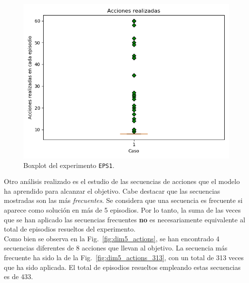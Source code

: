 \begin{figure}
    \centering
    \includegraphics[scale=0.4]{cap5_experimentacion/images/dim5_boxplot.png}
    \caption{Boxplot del experimento \texttt{EPS1}.}
    \label{fig:dim5_boxplot}
\end{figure}

Otro análisis realizado es el estudio de las secuencias de acciones que el modelo ha aprendido para alcanzar el objetivo. Cabe destacar que las secuencias mostradas son las más \textit{frecuentes}. Se considera que una secuencia es frecuente si aparece como solución en más de 5 episodios. Por lo tanto, la suma de las veces que se han aplicado las secuencias frecuentes \textbf{no} es necesariamente equivalente al total de episodios resueltos del experimento. \\

Como bien se observa en la 
Fig.~\ref{fig:dim5_actions}, se han encontrado 4 secuencias diferentes de 8 acciones que llevan al objetivo. La secuencia más frecuente ha sido la de la Fig.~\ref{fig:dim5_actions_313}, con un total de 313 veces que ha sido aplicada. El total de episodios resueltos empleando estas secuencias es de 433.
 

